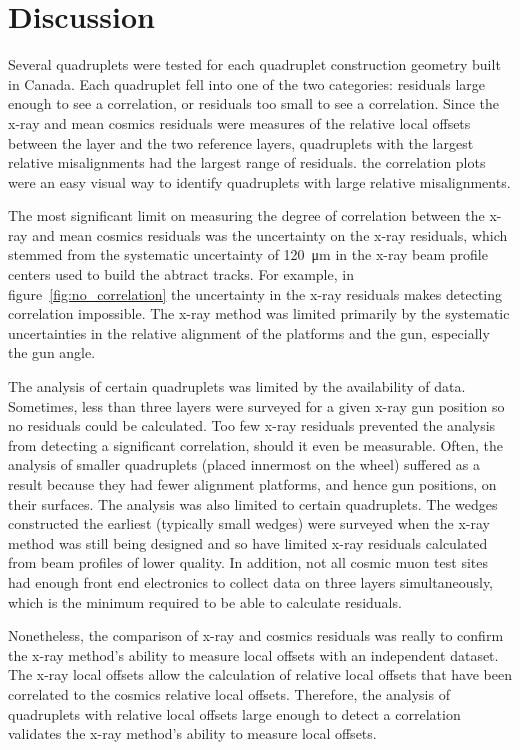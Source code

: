 \section{Discussion}

Several quadruplets were tested for each quadruplet construction geometry built in Canada. Each quadruplet fell into one of the two categories: residuals large enough to see a correlation, or residuals too small to see a correlation. Since the x-ray and mean cosmics residuals were measures of the relative local offsets between the layer and the two reference layers, quadruplets with the largest relative misalignments had the largest range of residuals. the correlation plots were an easy visual way to identify quadruplets with large relative misalignments.

The most significant limit on measuring the degree of correlation between the x-ray and mean cosmics residuals was the uncertainty on the x-ray residuals, which stemmed from the systematic uncertainty of \SI{120}{\micro\meter} in the x-ray beam profile centers used to build the abtract tracks. For example, in figure~\ref{fig:no_correlation} the uncertainty in the x-ray residuals makes detecting correlation impossible. The x-ray method was limited primarily by the systematic uncertainties in the relative alignment of the platforms and the gun, especially the gun angle.

The analysis of certain quadruplets was limited by the availability of data. Sometimes, less than three layers were surveyed for a given x-ray gun position so no residuals could be calculated. Too few x-ray residuals prevented the analysis from detecting a significant correlation, should it even be measurable. Often, the analysis of smaller quadruplets (placed innermost on the wheel) suffered as a result because they had fewer alignment platforms, and hence gun positions, on their surfaces. The analysis was also limited to certain quadruplets. The wedges constructed the earliest (typically small wedges) were surveyed when the x-ray method was still being designed and so have limited x-ray residuals calculated from beam profiles of lower quality. In addition, not all cosmic muon test sites had enough front end electronics to collect data on three layers simultaneously, which is the minimum required to be able to calculate residuals.

Nonetheless, the comparison of x-ray and cosmics residuals was really to confirm the x-ray method's ability to measure local offsets with an independent dataset. The x-ray local offsets allow the calculation of relative local offsets that have been correlated to the cosmics relative local offsets. Therefore, the analysis of quadruplets with relative local offsets large enough to detect a correlation validates the x-ray method's ability to measure local offsets. 

